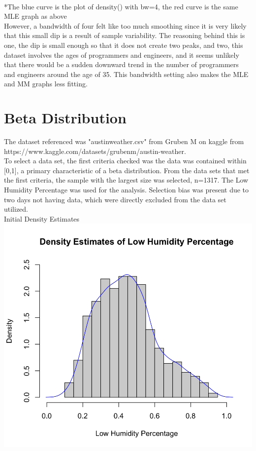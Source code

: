 \documentclass[12pt, letterpaper]{article}
\begin{document}
\footnotesize
\\ \**The blue curve is the plot of density() with bw=4, the red curve is the same MLE graph as above \\
\normalsize
However, a bandwidth of four felt like too much smoothing since it is very likely that this small dip is a result of sample variability. The reasoning behind this is one, the dip is small enough so that it does not create two peaks, and two, this dataset involves the ages of programmers and engineers, and it seems unlikely that there would be a sudden downward trend in the number of programmers and engineers around the age of 35. This bandwidth setting also makes the MLE and MM graphs less fitting.

\newpage
\noindent
\section*{Beta Distribution}
\normalsize
The dataset referenced was "austinweather.csv" from Gruben M on kaggle from \\ https://www.kaggle.com/datasets/grubenm/austin-weather. \\
To select a data set, the first criteria checked was the data was contained within [0,1], a primary characteristic of a beta distribution. From the data sets that met the first criteria, the sample with the largest size was selected, n=1317. The Low Humidity Percentage was used for the analysis. Selection bias was present due to two days not having data, which were directly excluded from the data set utilized.
\\[0.5\baselineskip]
Initial Density Estimates\\
\includegraphics[scale=0.40]{austinweather_densityestimates.png}
\end{document}
